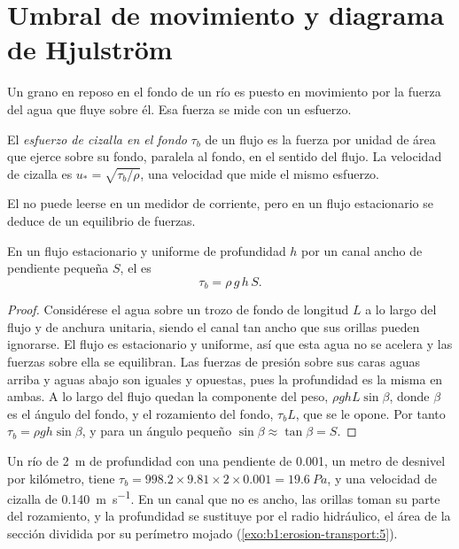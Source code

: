 \section{Umbral de movimiento y diagrama de Hjulström}\label{sec:b1:erosion-transport:threshold}

Un grano en reposo en el fondo de un río es puesto en movimiento por la fuerza del agua que fluye sobre él. Esa fuerza se mide con un esfuerzo.

\begin{definition}\label{def:b1:erosion-transport:bed-shear}
El \emph{esfuerzo de cizalla en el fondo} $\tau_b$ de un flujo es la fuerza por unidad de área que ejerce sobre
su fondo, paralela al fondo, en el sentido del flujo. La velocidad de cizalla es $u_* = \sqrt{\tau_b/\rho}$, una velocidad que mide el mismo esfuerzo.
\end{definition}

El  no puede leerse en un medidor de corriente, pero en un flujo estacionario se deduce de un equilibrio de fuerzas.

\begin{proposition}\label{prop:b1:erosion-transport:depth-slope}
En un flujo estacionario y uniforme de profundidad $h$ por un canal ancho de pendiente pequeña $S$, el  es
\[
  \tau_b = \rho\,g\,h\,S .
\]
\end{proposition}

\begin{proof}
Considérese el agua sobre un trozo de fondo de longitud $L$ a lo largo del flujo y de anchura unitaria, siendo el canal tan ancho que sus orillas
pueden ignorarse. El flujo es estacionario y uniforme, así que esta agua no se acelera y las fuerzas sobre ella se equilibran. Las fuerzas de presión
sobre sus caras aguas arriba y aguas abajo son iguales y opuestas, pues la profundidad es la misma en ambas. A lo largo del flujo quedan la componente
del peso, $\rho g h L \sin\beta$, donde $\beta$ es el ángulo del fondo, y el rozamiento del fondo, $\tau_b L$, que se le opone. Por tanto $\tau_b
= \rho g h \sin\beta$, y para un ángulo pequeño $\sin\beta \approx \tan\beta = S$.
\end{proof}

Un río de \qty{2}{m} de profundidad con una pendiente de \num{0.001}, un metro de desnivel por kilómetro, tiene $\tau_b = 998.2 \times 9.81 \times 2 \times 0.001 =
\qty{19.6}{Pa}$, y una velocidad de cizalla de \qty{0.140}{m.s^{-1}}. En un canal que no es ancho, las orillas toman su parte del rozamiento, y la
profundidad se sustituye por el radio hidráulico, el área de la sección dividida por su perímetro mojado (\cref{exo:b1:erosion-transport:5}).

